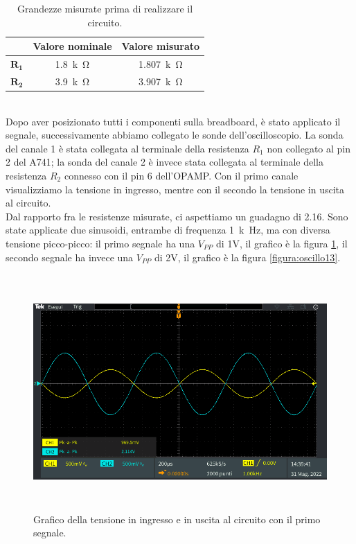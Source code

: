 \documentclass{report}
\begin{document}
\begin{table}[h]
	\centering
	\begin{tabular}{|c|c|c|}
	\cline{2-3} 
	\multicolumn{1}{c|}{} & \textbf{Valore nominale} & \textbf{Valore misurato}\\ 
		\hline
		$\mathbf{R_1}$& \SI{1.8}{k\ohm} & \SI{1.807}{k\ohm} \\ 
		\hline
		$\mathbf{R_2}$& \SI{3.9}{k\ohm} & \SI{3.907}{k\ohm} \\ 
		\hline
	\end{tabular}
\caption{Grandezze misurate prima di realizzare il circuito.}
\label{table:amplinv_comp}
\end{table}
\\Dopo aver posizionato tutti i componenti sulla breadboard, è stato applicato il segnale, successivamente abbiamo collegato le sonde dell'oscilloscopio. La sonda del canale 1 è stata collegata al terminale della resistenza $R_1$ non collegato al pin 2 del \textmu A741; la sonda del canale 2 è invece stata collegata al terminale della resistenza $R_2$ connesso con il pin 6 dell'OPAMP. Con il primo canale visualizziamo la tensione in ingresso, mentre con il secondo la tensione in uscita al circuito. 
\\\indent Dal rapporto fra le resistenze misurate, ci aspettiamo un guadagno di 2.16. Sono state applicate due sinusoidi, entrambe di frequenza \SI{1}{k\hertz}, ma con diversa tensione picco-picco: il primo segnale ha una $V_{PP}$ di 1V, il grafico è la figura \ref{figura:oscillo12}, il secondo segnale ha invece una $V_{PP}$ di 2V, il grafico è la figura \ref{figura:oscillo13}.
\begin{figure}[h]
\centering
\includegraphics[height=9cm]{immagini/oscillo12}
\caption{Grafico della tensione in ingresso e in uscita al circuito con il primo segnale.}
\label{figura:oscillo12}
\end{figure}
\end{document}
